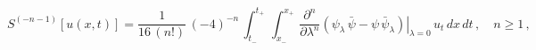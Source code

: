 \begin{equation*}
S^{(-n-1)}[u(x,t)] = \frac{1}{16\,({n}!)}\,(-4)^{-{n}}\,\int_{t_-}^{t_+}
\, \int_{x_-}^{x_+}
\,\frac{\partial^{{n}}}{\partial\lambda^{{n}}}\left.\left( \psi_\lambda
\,\bar{\psi}-\psi\,\bar{\psi}_\lambda
\right)\right|_{\lambda=0}\,u_t\,dx\,dt\,,\quad {n} \geq 1\,,
\end{equation*}

